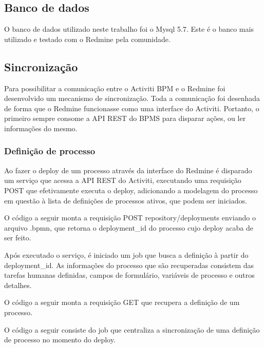 \subsection{Banco de dados}\label{sec:integracao_redmine_activiti_implementacao__bd}

O banco de dados utilizado neste trabalho foi o Mysql 5.7. Este é o banco mais utilizado e testado com o Redmine pela comunidade.

\subsection{Sincronização}\label{sec:integracao_redmine_activiti_implementacao_sincronizacao}

Para possibilitar a comunicação entre o Activiti BPM e o Redmine foi desenvolvido um mecanismo de sincronização.
Toda a comunicação foi desenhada de forma que o Redmine funcionasse como uma interface do Activiti. Portanto, o primeiro sempre consome a API REST do BPMS para disparar ações, ou ler informações do mesmo.

\subsubsection{Definição de processo}

Ao fazer o deploy de um processo através da interface do Redmine é disparado um serviço que acessa a API REST do Activiti, executando uma requisição POST que efetivamente executa o deploy, adicionando a modelagem do processo em questão à lista de definições de processos ativos, que podem ser iniciados.

O código a seguir monta a requisição POST repository/deployments enviando o arquivo .bpmn, que retorna o deployment\_id do processo cujo deploy acaba de ser feito.



Após executado o serviço, é iniciado um job que busca a definição à partir do deployment\_id. As informações do processo que são recuperadas consistem das tarefas humanas definidas, campos de formulário, variáveis de processo e outros detalhes.

O código a seguir monta a requisição GET que recupera a definição de um processo.


O código a seguir consiste do job que centraliza a sincronização de uma definição de processo no momento do deploy. 

